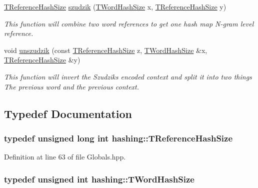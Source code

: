 \begin{DoxyCompactItemize}
\hyperlink{namespacehashing_a0c0f51ea23331c249e570f323e48056c}{T\+Reference\+Hash\+Size} \hyperlink{namespacehashing_a14faa1694242a5c0980b79bd8ea32f59}{szudzik} (\hyperlink{namespacehashing_aa08467967a260f22e9dcf6983aa38c81}{T\+Word\+Hash\+Size} x, \hyperlink{namespacehashing_a0c0f51ea23331c249e570f323e48056c}{T\+Reference\+Hash\+Size} y)
\begin{DoxyCompactList}\small\item\em This function will combine two word references to get one hash map N-\/gram level reference. \end{DoxyCompactList}\item 
void \hyperlink{namespacehashing_adc6c8d839598eb1016caf13010a9034e}{unszudzik} (const \hyperlink{namespacehashing_a0c0f51ea23331c249e570f323e48056c}{T\+Reference\+Hash\+Size} z, \hyperlink{namespacehashing_aa08467967a260f22e9dcf6983aa38c81}{T\+Word\+Hash\+Size} \&x, \hyperlink{namespacehashing_a0c0f51ea23331c249e570f323e48056c}{T\+Reference\+Hash\+Size} \&y)
\begin{DoxyCompactList}\small\item\em This function will invert the Szudzik\textquotesingle{}s encoded context and split it into two things The previous word and the previous context. \end{DoxyCompactList}\end{DoxyCompactItemize}


\subsection{Typedef Documentation}
\hypertarget{namespacehashing_a0c0f51ea23331c249e570f323e48056c}{}
\subsubsection[{T\+Reference\+Hash\+Size}]{\setlength{\rightskip}{0pt plus 5cm}typedef unsigned long int {\bf hashing\+::\+T\+Reference\+Hash\+Size}}\label{namespacehashing_a0c0f51ea23331c249e570f323e48056c}


Definition at line 63 of file Globals.\+hpp.

\hypertarget{namespacehashing_aa08467967a260f22e9dcf6983aa38c81}{}
\subsubsection[{T\+Word\+Hash\+Size}]{\setlength{\rightskip}{0pt plus 5cm}typedef unsigned int {\bf hashing\+::\+T\+Word\+Hash\+Size}}\label{namespacehashing_aa08467967a260f22e9dcf6983aa38c81}


